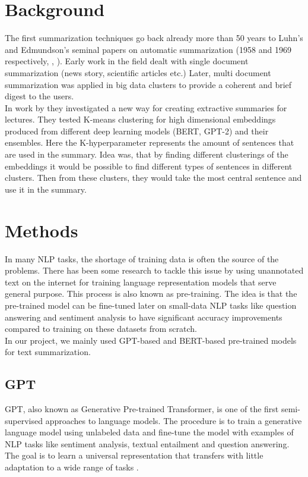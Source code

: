 \documentclass{article}
\begin{document}
\clearpage
\section{Background}
The first summarization techniques go back already more than 50 years to Luhn’s and Edmundson’s seminal papers on automatic summarization (1958 and 1969 respectively, \cite{textmining1958}, \cite{automaticextracting}). Early work in the field dealt with single document summarization (news story, scientific articles etc.) Later, multi document summarization was applied in big data clusters to provide a coherent and brief digest to the users. \\

In work by \cite{extractive_bert} they investigated a new way for creating extractive summaries for lectures. They tested K-means clustering for high dimensional embeddings produced from different deep learning models (BERT, GPT-2) and their ensembles. Here the K-hyperparameter represents the amount of sentences that are used in the summary. Idea was, that by finding different clusterings of the embeddings it would be possible to find different types of sentences in different clusters. Then from these clusters, they would take the most central sentence and use it in the summary. 


\clearpage
\section{Methods}

In many NLP tasks, the shortage of training data is often the source of the problems. There has been some research to tackle this issue by using unannotated text on the internet for training language representation models that serve general purpose. This process is also known as pre-training. The idea is that the pre-trained model can be fine-tuned later on small-data NLP tasks like question answering and sentiment analysis to have significant accuracy improvements compared to training on these datasets from scratch. \\

In our project, we mainly used GPT-based and BERT-based pre-trained models for text summarization.

\subsection*{GPT}

GPT, also known as Generative Pre-trained Transformer, is one of the first semi-supervised approaches to language models. The procedure is to train a generative language model using unlabeled data and fine-tune the model with examples of NLP tasks like sentiment analysis, textual entailment and question answering. The goal is to learn a universal representation that transfers with little adaptation to a wide range of tasks \cite{gpt}. \\
\end{document}
